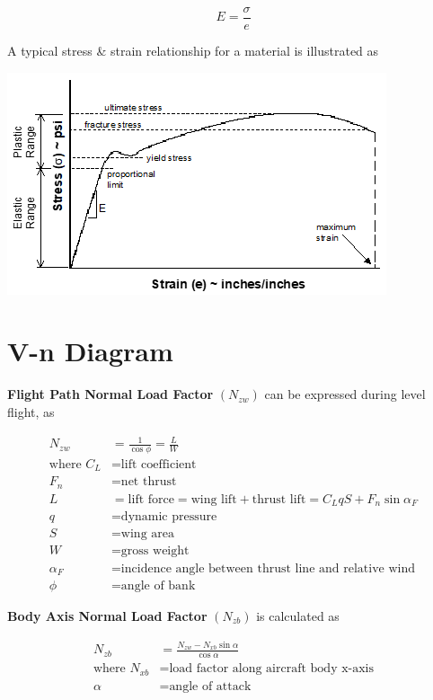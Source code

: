\documentclass[
]{book}
\begin{document}
\[
  E = \frac{\sigma}{e}
\]

A typical stress \& strain relationship for a material is illustrated as

\includegraphics[width=4.39514in,height=2.57292in]{media/09/image2.png}

\hypertarget{v-n-diagram}{%
\section{V-n Diagram}\label{v-n-diagram}}

\textbf{Flight Path Normal Load Factor} \(\left(N_{zw} \right)\) can be expressed during level flight, as

\[
  \begin{align}
  N_{zw} &= \frac{1}{\cos \phi} = \frac{L}{W} \\
  \text{where } C_L &= \text{lift coefficient} \\
  F_n &= \text{net thrust} \\
  L &= \text{lift force} = \text{wing lift} + \text{thrust lift} = C_L qS + F_n \sin \alpha_F \\
  q &= \text{dynamic pressure} \\
  S &= \text{wing area} \\
  W &= \text{gross weight} \\
  \alpha_F &= \text{incidence angle between thrust line and relative wind} \\
  \phi &= \text{angle of bank}
  \end{align}
\]

\textbf{Body Axis Normal Load Factor} \(\left(N_{zb} \right)\) is calculated as

\[
  \begin{align}
  N_{zb} &= \frac{N_{zw} - N_{xb} \sin \alpha}{\cos \alpha} \\
  \text{where } N_{xb} &= \text{load factor along aircraft body x-axis} \\
  \alpha &= \text{angle of attack} \\
  \end{align}
\]
\end{document}
